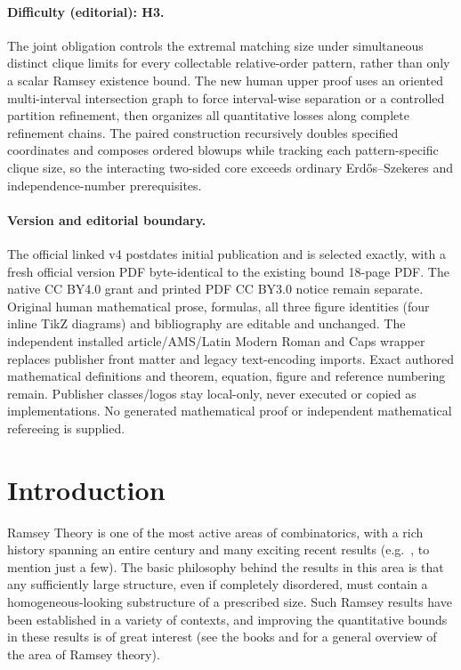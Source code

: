 \documentclass[11pt]{article}
\theoremstyle{definition}
\numberwithin{equation}{section}
\numberwithin{figure}{section}
\begin{document}
\paragraph{Difficulty (editorial): H3.} The joint obligation controls the extremal matching size under simultaneous distinct clique limits for every collectable relative-order pattern, rather than only a scalar Ramsey existence bound. The new human upper proof uses an oriented multi-interval intersection graph to force interval-wise separation or a controlled partition refinement, then organizes all quantitative losses along complete refinement chains. The paired construction recursively doubles specified coordinates and composes ordered blowups while tracking each pattern-specific clique size, so the interacting two-sided core exceeds ordinary Erdős--Szekeres and independence-number prerequisites.
\paragraph{Version and editorial boundary.} The official linked v4 postdates initial publication and is selected exactly, with a fresh official version PDF byte-identical to the existing bound 18-page PDF. The native CC BY4.0 grant and printed PDF CC BY3.0 notice remain separate. Original human mathematical prose, formulas, all three figure identities (four inline TikZ diagrams) and bibliography are editable and unchanged. The independent installed article/AMS/Latin Modern Roman and Caps wrapper replaces publisher front matter and legacy text-encoding imports. Exact authored mathematical definitions and theorem, equation, figure and reference numbering remain. Publisher classes/logos stay local-only, never executed or copied as implementations. No generated mathematical proof or independent mathematical refereeing is supplied.
\clearpage
\section{Introduction}

Ramsey Theory is one of the most active areas of combinatorics, with a rich history spanning an entire century and many exciting recent results (e.g.~\cite{Campos, Lee, MV, RR}, to mention just a few). The basic philosophy behind the results in this area is that any sufficiently large structure, even if completely disordered, must contain a homogeneous-looking substructure of a prescribed size. Such Ramsey results have been established in a variety of contexts, and improving the quantitative bounds in these results is of great interest (see the books \cite{graham-rothschild-spencer} and \cite{promel} for a general overview of the area of Ramsey theory).
\end{document}
